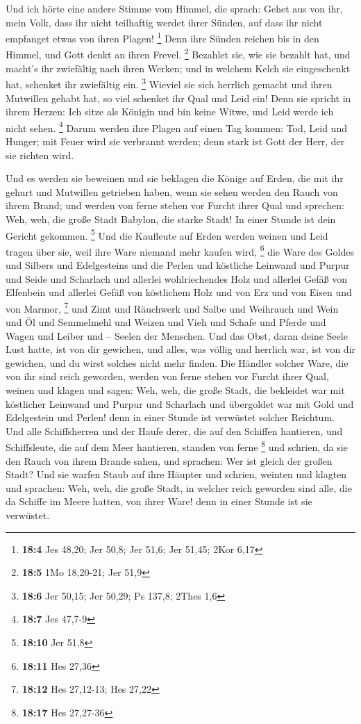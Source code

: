  Und ich hörte eine andere Stimme vom Himmel, die sprach:
Gehet aus von ihr, mein Volk, dass ihr nicht teilhaftig werdet ihrer
Sünden, auf dass ihr nicht empfanget etwas von ihren Plagen! \footnote{\textbf{18:4}
  Jes 48,20; Jer 50,8; Jer 51,6; Jer 51,45; 2Kor 6,17} 
Denn ihre Sünden reichen bis in den Himmel, und Gott denkt an ihren
Frevel. \footnote{\textbf{18:5} 1Mo 18,20-21; Jer 51,9} 
Bezahlet sie, wie sie bezahlt hat, und macht's ihr zwiefältig nach ihren
Werken; und in welchem Kelch sie eingeschenkt hat, schenket ihr
zwiefältig ein. \footnote{\textbf{18:6} Jer 50,15; Jer 50,29; Ps 137,8;
  2Thes 1,6}  Wieviel sie sich herrlich gemacht und ihren
Mutwillen gehabt hat, so viel schenket ihr Qual und Leid ein! Denn sie
spricht in ihrem Herzen: Ich sitze als Königin und bin keine Witwe, und
Leid werde ich nicht sehen. \footnote{\textbf{18:7} Jes 47,7-9}
 Darum werden ihre Plagen auf einen Tag kommen: Tod, Leid
und Hunger; mit Feuer wird sie verbrannt werden; denn stark ist Gott der
Herr, der sie richten wird.

 Und es werden sie beweinen und sie beklagen die Könige
auf Erden, die mit ihr gehurt und Mutwillen getrieben haben, wenn sie
sehen werden den Rauch von ihrem Brand;  und werden von
ferne stehen vor Furcht ihrer Qual und sprechen: Weh, weh, die große
Stadt Babylon, die starke Stadt! In einer Stunde ist dein Gericht
gekommen. \footnote{\textbf{18:10} Jer 51,8}  Und die
Kaufleute auf Erden werden weinen und Leid tragen über sie, weil ihre
Ware niemand mehr kaufen wird, \footnote{\textbf{18:11} Hes 27,36}
 die Ware des Goldes und Silbers und Edelgesteins und die
Perlen und köstliche Leinwand und Purpur und Seide und Scharlach und
allerlei wohlriechendes Holz und allerlei Gefäß von Elfenbein und
allerlei Gefäß von köstlichem Holz und von Erz und von Eisen und von
Marmor, \footnote{\textbf{18:12} Hes 27,12-13; Hes 27,22}
 und Zimt und Räuchwerk und Salbe und Weihrauch und Wein
und Öl und Semmelmehl und Weizen und Vieh und Schafe und Pferde und
Wagen und Leiber und -- Seelen der Menschen.  Und das
Obst, daran deine Seele Lust hatte, ist von dir gewichen, und alles, was
völlig und herrlich war, ist von dir gewichen, und du wirst solches
nicht mehr finden.  Die Händler solcher Ware, die von ihr
sind reich geworden, werden von ferne stehen vor Furcht ihrer Qual,
weinen und klagen  und sagen: Weh, weh, die große Stadt,
die bekleidet war mit köstlicher Leinwand und Purpur und Scharlach und
übergoldet war mit Gold und Edelgestein und Perlen!  denn
in einer Stunde ist verwüstet solcher Reichtum. Und alle Schiffsherren
und der Haufe derer, die auf den Schiffen hantieren, und Schiffsleute,
die auf dem Meer hantieren, standen von ferne \footnote{\textbf{18:17}
  Hes 27,27-36}  und schrien, da sie den Rauch von ihrem
Brande sahen, und sprachen: Wer ist gleich der großen Stadt?
 Und sie warfen Staub auf ihre Häupter und schrien,
weinten und klagten und sprachen: Weh, weh, die große Stadt, in welcher
reich geworden sind alle, die da Schiffe im Meere hatten, von ihrer
Ware! denn in einer Stunde ist sie verwüstet.

